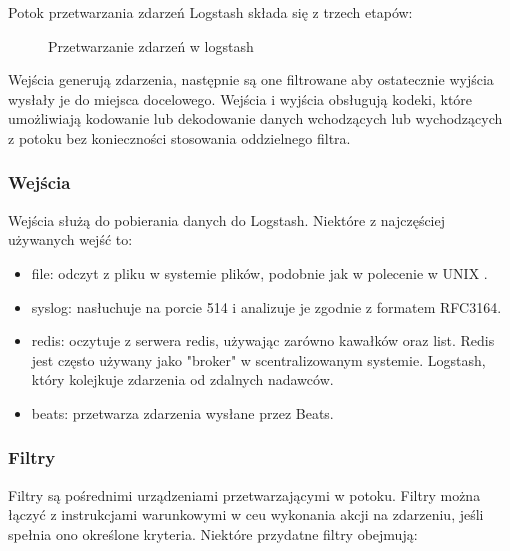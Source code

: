 Potok przetwarzania zdarzeń Logstash składa się z trzech etapów:

\begin{figure}[!htbp]
    \centering
    
    \caption{Przetwarzanie zdarzeń w logstash}
    \label{fig:enter-label}
\end{figure}

Wejścia generują zdarzenia, następnie są one filtrowane aby ostatecznie wyjścia wysłały je do miejsca docelowego. Wejścia i wyjścia obsługują kodeki, które umożliwiają kodowanie lub dekodowanie danych wchodzących lub wychodzących z potoku bez konieczności  stosowania oddzielnego filtra\cite{logstashManualHowItWorks}. 

\subsubsection{Wejścia}

Wejścia służą do pobierania danych do Logstash. Niektóre z najczęściej używanych wejść to:

\begin{itemize}
    \item file: odczyt z pliku w systemie plików, podobnie jak w polecenie w UNIX \cite{logstashManualHowItWorks}.
    \item syslog: nasłuchuje na porcie 514 i analizuje je zgodnie z formatem RFC3164\cite{rfc3164}\cite{logstashManualHowItWorks}.
    \item redis: oczytuje z serwera redis, używając zarówno kawałków oraz list. Redis jest często używany jako "broker" w scentralizowanym systemie. Logstash, który kolejkuje zdarzenia od zdalnych nadawców\cite{logstashManualHowItWorks}.
    \item beats: przetwarza zdarzenia wysłane przez Beats\cite{logstashManualHowItWorks}.
\end{itemize}

\subsubsection{Filtry}

Filtry są pośrednimi urządzeniami przetwarzającymi w potoku. Filtry można łączyć z instrukcjami warunkowymi w ceu wykonania akcji na zdarzeniu, jeśli spełnia ono określone kryteria. Niektóre przydatne filtry obejmują: 

